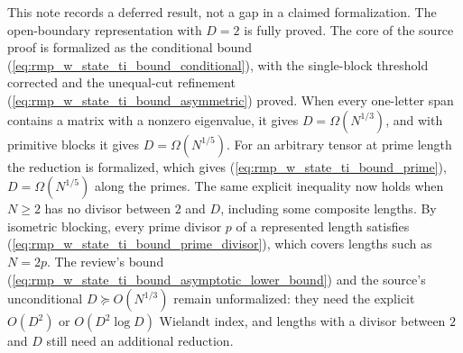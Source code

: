 \documentclass{article}
\begin{document}
This note records a deferred result, not a gap in a claimed formalization. The
open-boundary representation with $D=2$ is fully proved. The core of the
source proof is formalized as the conditional bound
(\ref{eq:rmp_w_state_ti_bound_conditional}), with the single-block threshold
corrected and the unequal-cut refinement
(\ref{eq:rmp_w_state_ti_bound_asymmetric}) proved. When every one-letter
span contains a matrix with a nonzero eigenvalue, it gives
$D=\Omega(N^{1/3})$, and with primitive blocks it gives
$D=\Omega(N^{1/5})$. For an arbitrary tensor at prime length the reduction is
formalized, which gives
(\ref{eq:rmp_w_state_ti_bound_prime}), $D=\Omega(N^{1/5})$ along the primes.
The same explicit inequality now holds when $N\geq2$ has no divisor between
$2$ and $D$, including some composite lengths. By isometric blocking, every
prime divisor $p$ of a represented length satisfies
(\ref{eq:rmp_w_state_ti_bound_prime_divisor}), which covers lengths such as
$N=2p$.
The review's bound
(\ref{eq:rmp_w_state_ti_bound_asymptotic_lower_bound}) and the source's
unconditional $D\succeq O(N^{1/3})$ remain unformalized: they need the
explicit $O(D^2)$ or $O(D^2\log D)$ Wielandt index, and lengths with a
divisor between $2$ and $D$ still need an additional reduction.



\end{document}
